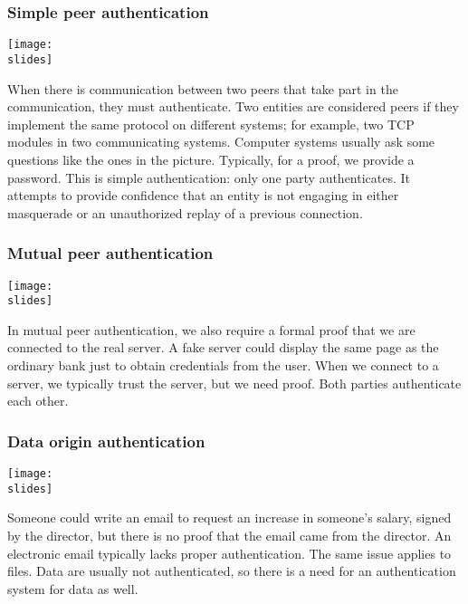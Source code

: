 \subsubsection{Simple peer authentication}

\noindent
\begin{minipage}{0.5\textwidth}
  \centering
  \texttt{[image: \\slides]}
\end{minipage}
\hspace{0.05\textwidth}
\begin{minipage}{0.4\textwidth}
  When there is communication between two peers that take part in the communication, they must authenticate. Two entities are considered peers if they implement the same protocol on different systems; for example, two TCP modules in two communicating systems. Computer systems usually ask some questions like the ones in the picture. Typically, for a proof, we provide a password. This is simple authentication: only one party authenticates. It attempts to provide confidence that an entity is not engaging in either masquerade or an unauthorized replay of a previous connection.
\end{minipage}


\subsubsection{Mutual peer authentication}
\noindent
\begin{minipage}{0.5\textwidth}
  \centering
  \texttt{[image: \\slides]}
\end{minipage}
\hspace{0.05\textwidth}
\begin{minipage}{0.4\textwidth}
  In mutual peer authentication, we also require a formal proof that we are connected to the real server. A fake server could display the same page as the ordinary bank just to obtain credentials from the user. When we connect to a server, we typically trust the server, but we need proof. Both parties authenticate each other.
\end{minipage}

\subsubsection{Data origin authentication}
\noindent
\begin{minipage}{0.5\textwidth}
  \centering
  \texttt{[image: \\slides]}
\end{minipage}
\hspace{0.05\textwidth}
\begin{minipage}{0.4\textwidth}
  Someone could write an email to request an increase in someone's salary, signed by the director, but there is no proof that the email came from the director. An electronic email typically lacks proper authentication. The same issue applies to files. Data are usually not authenticated, so there is a need for an authentication system for data as well.
\end{minipage}

